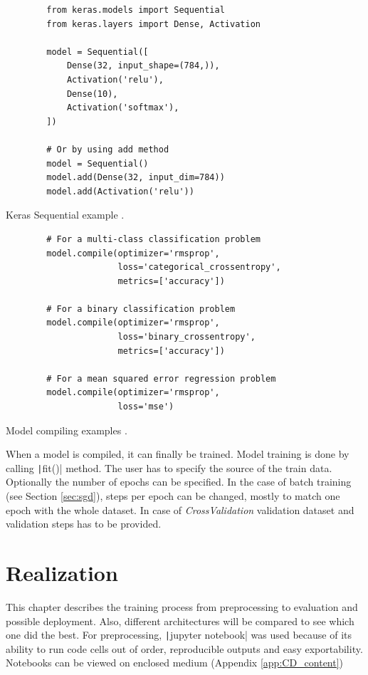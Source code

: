 \documentclass[thesis=B,english]{FITthesis}[2019/12/23]
\begin{document}
\begin{listing}
    \begin{verbatim}
        from keras.models import Sequential
        from keras.layers import Dense, Activation

        model = Sequential([
            Dense(32, input_shape=(784,)),
            Activation('relu'),
            Dense(10),
            Activation('softmax'),
        ])
        
        # Or by using add method
        model = Sequential()
        model.add(Dense(32, input_dim=784))
        model.add(Activation('relu'))
    \end{verbatim}
    \caption[Keras Sequential example]{Keras Sequential example \cite{keras_sequential_example}.}
    \label{lis:seq_example}
\end{listing}


\begin{listing}
    \begin{verbatim}
        # For a multi-class classification problem
        model.compile(optimizer='rmsprop',
                      loss='categorical_crossentropy',
                      metrics=['accuracy'])
        
        # For a binary classification problem
        model.compile(optimizer='rmsprop',
                      loss='binary_crossentropy',
                      metrics=['accuracy'])
        
        # For a mean squared error regression problem
        model.compile(optimizer='rmsprop',
                      loss='mse')
    \end{verbatim}
    \caption[Model compiling examples]{Model compiling examples \cite{keras_sequential_example}.}
    \label{lis:seq_example_compile}
\end{listing}

When a model is compiled, it can finally be trained. Model training is done by calling \texttt|fit()| method. The user has to specify the source of the train data. Optionally the number of epochs can be specified. In the case of batch training (see Section \ref{sec:sgd}), steps per epoch can be changed, mostly to match one epoch with the whole dataset. In case of \emph{CrossValidation} validation dataset and validation steps has to be provided. 


\chapter{Realization}
This chapter describes the training process from preprocessing to evaluation and possible deployment. Also, different architectures will be compared to see which one did the best. For preprocessing, \texttt|jupyter notebook| was used because of its ability to run code cells out of order, reproducible outputs and easy exportability. Notebooks can be viewed on enclosed medium (Appendix \ref{app:CD_content})
\end{document}
